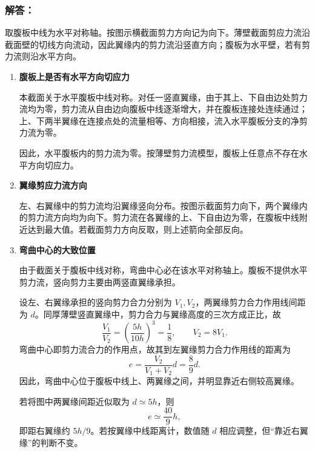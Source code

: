 \documentclass[11pt,a4paper]{ctexrep}
\begin{document}
{\subsubsection*{解答：}

取腹板中线为水平对称轴。按图示横截面剪力方向记为向下。薄壁截面剪应力流沿截面壁的切线方向流动，因此翼缘内的剪力流沿竖直方向；腹板为水平壁，若有剪力流则沿水平方向。

\begin{enumerate}[label=(\arabic*)]
  \item \textbf{腹板上是否有水平方向切应力}

  本截面关于水平腹板中线对称。对任一竖直翼缘，由于其上、下自由边处剪力流均为零，剪力流从自由边向腹板中线逐渐增大，并在腹板连接处连续通过；上、下两半翼缘在连接点处的流量相等、方向相接，流入水平腹板分支的净剪力流为零。

  因此，水平腹板内的剪力流为零。按薄壁剪力流模型，腹板上任意点不存在水平方向切应力。

  \item \textbf{翼缘剪应力流方向}

  左、右翼缘中的剪力流均沿翼缘竖向分布。按图示截面剪力向下，两个翼缘内的剪力流方向均为向下。剪力流在各翼缘的上、下自由边为零，在腹板中线附近达到最大值。若截面剪力方向反取，则上述箭向全部反向。

  \item \textbf{弯曲中心的大致位置}

  由于截面关于腹板中线对称，弯曲中心必在该水平对称轴上。腹板不提供水平剪力流，竖向剪力主要由两竖直翼缘承担。

  设左、右翼缘承担的竖向剪力合力分别为 $V_1,V_2$，两翼缘剪力合力作用线间距为 $d$。同厚薄壁竖直翼缘中，剪力合力与翼缘高度的三次方成正比，故
  \[
  \frac{V_1}{V_2}
  =
  \left(\frac{5h}{10h}\right)^3
  =
  \frac{1}{8},
  \qquad
  V_2=8V_1 .
  \]
  弯曲中心即剪力流合力的作用点，故其到左翼缘剪力合力作用线的距离为
  \[
  e=\frac{V_2}{V_1+V_2}d=\frac{8}{9}d.
  \]
  因此，弯曲中心位于腹板中线上、两翼缘之间，并明显靠近右侧较高翼缘。

  若将图中两翼缘间距近似取为 $d\simeq 5h$，则
  \[
  e\simeq \frac{40}{9}h,
  \]
  即距右翼缘约 $5h/9$。若按翼缘中线距离计，数值随 $d$ 相应调整，但“靠近右翼缘”的判断不变。
\end{enumerate}


}
\end{document}
